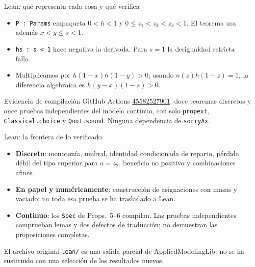 \documentclass[11pt,aspectratio=169]{beamer}
\begin{document}
\begin{frame}{Lean: qué representa cada cosa y qué verifica}
  \begin{itemize}
    \item \texttt{P : Params} empaqueta $0<h<1$ y $0\le z_1<z_2<z_3<1$.
      El teorema usa además $x<y\le s<1$.
    \item \texttt{hs : s < 1} hace negativa la derivada. Para $s=1$ la
      desigualdad estricta falla.
    \item Multiplicamos por $h(1-x)h(1-y)>0$; usando
      $n(z)h(1-z)=1$, la diferencia algebraica es $h(y-x)(1-s)>0$.
  \end{itemize}
  \vfill
  \begin{block}{Evidencia de compilación}
    GitHub Actions \href{https://github.com/alejandroventuraventurameza-tech/ai-05-ide/actions/runs/45582527901}{45582527901}:
    doce teoremas discretos y once pruebas independientes del modelo continuo,
    con solo \texttt{propext}, \texttt{Classical.choice} y \texttt{Quot.sound}.
    Ninguna dependencia de \texttt{sorryAx}.
  \end{block}
\end{frame}

\begin{frame}{Lean: la frontera de lo verificado}
  \begin{itemize}
    \item \textbf{Discreto}: monotonía, umbral, identidad condicionada de reparto,
      pérdida débil del tipo superior para $a=z_2$, beneficio no positivo y combinaciones afines.
    \item \textbf{En papel y numéricamente}: construcción de asignaciones con masas y
      vaciado; no toda esa prueba se ha trasladado a Lean.
    \item \textbf{Continuo}: los \texttt{Spec} de Props.\ 5--6 compilan.
      Las pruebas independientes comprueban lemas y dos defectos de traducción;
      no demuestran las proposiciones completas.
  \end{itemize}
  \vfill
  El archivo original \texttt{lean/} es una salida parcial de AppliedModelingLib:
  no se ha sustituido con una selección de los resultados nuevos.
\end{frame}
\end{document}
